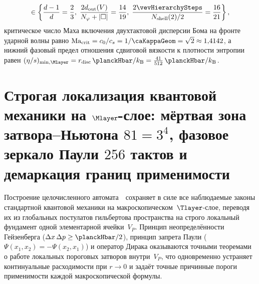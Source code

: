 \begin{theorem}
\begin{enumerate}[leftmargin=*]
\begin{equation}
\begin{aligned}
    \in \left\{\frac{d-1}{d} = \frac{2}{3},\; \frac{2d_{\mathrm{out}}(V)}{N_\varphi + |\square|} = \frac{14}{19},\; \frac{2\vevHierarchySteps}{N_{\mathrm{shell}}(2)/2} = \frac{16}{21}\right\},
  \end{aligned}
  \end{equation}
  критическое число Маха включения двухтактовой дисперсии Бома на фронте ударной волны равно $\mathrm{Ma}_{\mathrm{crit}} = c_0/c_s = 1/\caKappaGeom = \sqrt{2} \approx 1{,}4142$, а нижний фазовый предел отношения сдвиговой вязкости к плотности энтропии равен $(\eta/s)_{\min,\Mlayer} = r_{\mathrm{disc}}\,\planckHbar/k_{\mathrm{B}} = \frac{41}{512}\,\planckHbar/k_{\mathrm{B}}$.
\end{enumerate}
\end{theorem}

\section{Строгая локализация квантовой механики на \texorpdfstring{$\Mlayer$}{M}-слое: мёртвая зона затвора--Ньютона \texorpdfstring{$81 = 3^4$}{81 = 3\^4}, фазовое зеркало Паули \texorpdfstring{$256$}{256} тактов и демаркация границ применимости}
\label{sec:compute-strict-locality-and-demarcation}

Построение целочисленного автомата~\latGCKshort\ сохраняет в силе все наблюдаемые законы стандартной квантовой механики на макроскопическом~$\Tlayer$-слое, переводя их из глобальных постулатов гильбертова пространства на строго локальный фундамент одной элементарной ячейки~$V_P$.
Принцип неопределённости Гейзенберга ($\Delta x\,\Delta p \ge \planckHbar/2$), принцип запрета Паули ($\Psi(x_1,x_2) = -\Psi(x_2,x_1)$) и оператор Дирака оказываются точными теоремами о работе локальных пороговых затворов внутри~$V_P$, что одновременно устраняет континуальные расходимости при $r\to 0$ и задаёт точные причинные пороги применимости каждой макроскопической формулы.

